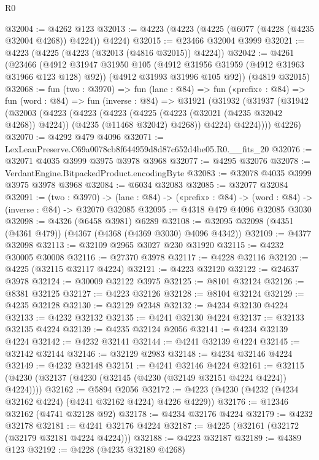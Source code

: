 \begin{lexlean}{R0}
\begin{coremodule}
@32004 := @4262 @123
@32013 := @4223 (@4223 (@4225 (@6077 (@4228 (@4235 @32004 @4268)) @4224)) @4224)
@32015 := @23466 @32004 @3999
@32021 := @4223 (@4225 (@4223 (@32013 (@4816 @32015)) @4224))
@32042 := @4261
    (@23466
      (@4912 @31947 @31950 @105 (@4912 @31956 @31959 (@4912 @31963 @31966 @123 @128) @92))
      (@4912 @31993 @31996 @105 @92))
    (@4819 @32015)
@32068 := fun (two : @3970) =>
  fun (lane : @84) =>
  fun («prefix» : @84) =>
  fun (word : @84) =>
  fun (inverse : @84) =>
  @31921
    (@31932
      (@31937
        (@31942
          (@32003
            (@4223
              (@4223
                (@4223
                  (@4225 (@4223 (@32021 (@4235 @32042 @4268)) @4224))
                  (@4235 (@11468 @32042) @4268))
                @4224)
              @4224))))
      @4226)
@32070 := @4292 @479 @4096
@32071 := LexLeanPreserve.C69a0078cb8f644959d8d87c652d4be05.R0.__fits_20
@32076 := @32071 @4035 @3999 @3975 @3978 @3968
@32077 := @4295 @32076
@32078 := VerdantEngine.BitpackedProduct.encodingByte
@32083 := @32078 @4035 @3999 @3975 @3978 @3968
@32084 := @6034 @32083
@32085 := @32077 @32084
@32091 := (two : @3970) ->
  (lane : @84) -> («prefix» : @84) -> (word : @84) -> (inverse : @84) -> @32070 @32085
@32095 := @4318 @479 @4096 @32085 @3030
@32098 := @4326 (@6458 @3981) @6289
@32108 := @32095 @32098 (@4351 (@4361 @479)) (@4367 (@4368 (@4369 @3030) @4096 @4342))
@32109 := @4377 @32098
@32113 := @32109 @2965 @3027 @230 @31920
@32115 := @4232 @30005 @30008
@32116 := @27370 @3978
@32117 := @4228 @32116
@32120 := @4225 (@32115 @32117 @4224)
@32121 := @4223 @32120
@32122 := @24637 @3978
@32124 := @30009 @32122 @3975
@32125 := @8101 @32124
@32126 := @8381 @32125
@32127 := @4223 @32126
@32128 := @8104 @32124
@32129 := @4235 @32128
@32130 := @32129 @2348
@32132 := @4234 @32130 @4224
@32133 := @4232 @32132
@32135 := @4241 @32130 @4224
@32137 := @32133 @32135 @4224
@32139 := @4235 @32124 @2056
@32141 := @4234 @32139 @4224
@32142 := @4232 @32141
@32144 := @4241 @32139 @4224
@32145 := @32142 @32144
@32146 := @32129 @2983
@32148 := @4234 @32146 @4224
@32149 := @4232 @32148
@32151 := @4241 @32146 @4224
@32161 := @32115 (@4230 (@32137 (@4230 (@32145 (@4230 (@32149 @32151 @4224 @4224)) @4224))))
@32162 := @5894 @2056
@32172 := @4223 (@4230 (@4232 (@4234 @32162 @4224) (@4241 @32162 @4224) @4226 @4229))
@32176 := @12346 @32162 (@4741 @32128 @92)
@32178 := @4234 @32176 @4224
@32179 := @4232 @32178
@32181 := @4241 @32176 @4224
@32187 := @4225 (@32161 (@32172 (@32179 @32181 @4224 @4224)))
@32188 := @4223 @32187
@32189 := @4389 @123
@32192 := @4228 (@4235 @32189 @4268)

\end{coremodule}
\end{lexlean}

